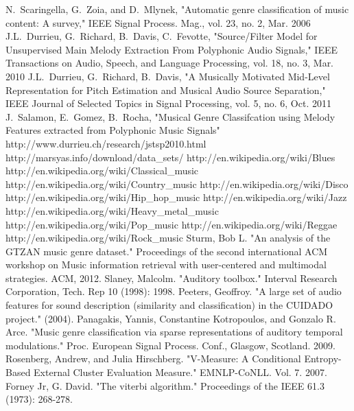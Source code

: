 \documentclass[12pt,journal,compsoc]{IEEEtran}
\begin{document}
%
%
%
\begin{thebibliography}{100}

N.~Scaringella, G.~Zoia, and D.~Mlynek, "Automatic genre classification of music content: A survey," IEEE Signal Process. Mag., vol. 23, no. 2, Mar. 2006
J.L.~Durrieu, G.~Richard, B.~Davis, C.~Fevotte, "Source/Filter Model for Unsupervised Main Melody Extraction From Polyphonic Audio Signals," IEEE Transactions on Audio, Speech, and Language Processing, vol. 18, no. 3, Mar. 2010
J.L.~Durrieu, G.~Richard, B.~Davis, "A Musically Motivated Mid-Level Representation for Pitch Estimation and Musical Audio Source Separation," IEEE Journal of Selected Topics in Signal Processing, vol. 5, no. 6, Oct. 2011
J.~Salamon, E.~Gomez, B.~Rocha, "Musical Genre Classifcation using Melody Features extracted from Polyphonic Music Signals"
http://www.durrieu.ch/research/jstsp2010.html
http://marsyas.info/download/data\_sets/
http://en.wikipedia.org/wiki/Blues
http://en.wikipedia.org/wiki/Classical\_music
http://en.wikipedia.org/wiki/Country\_music
http://en.wikipedia.org/wiki/Disco
http://en.wikipedia.org/wiki/Hip\_hop\_music
http://en.wikipedia.org/wiki/Jazz
http://en.wikipedia.org/wiki/Heavy\_metal\_music
http://en.wikipedia.org/wiki/Pop\_music
http://en.wikipedia.org/wiki/Reggae
http://en.wikipedia.org/wiki/Rock\_music
Sturm, Bob L. "An analysis of the GTZAN music genre dataset." Proceedings of the second international ACM workshop on Music information retrieval with user-centered and multimodal strategies. ACM, 2012.
Slaney, Malcolm. "Auditory toolbox." Interval Research Corporation, Tech. Rep 10 (1998): 1998.
Peeters, Geoffroy. "{A large set of audio features for sound description (similarity and classification) in the CUIDADO project}." (2004).
Panagakis, Yannis, Constantine Kotropoulos, and Gonzalo R. Arce. "Music genre classification via sparse representations of auditory temporal modulations." Proc. European Signal Process. Conf., Glasgow, Scotland. 2009.
Rosenberg, Andrew, and Julia Hirschberg. "V-Measure: A Conditional Entropy-Based External Cluster Evaluation Measure." EMNLP-CoNLL. Vol. 7. 2007.
Forney Jr, G. David. "The viterbi algorithm." Proceedings of the IEEE 61.3 (1973): 268-278.

\end{thebibliography}
\end{document}
